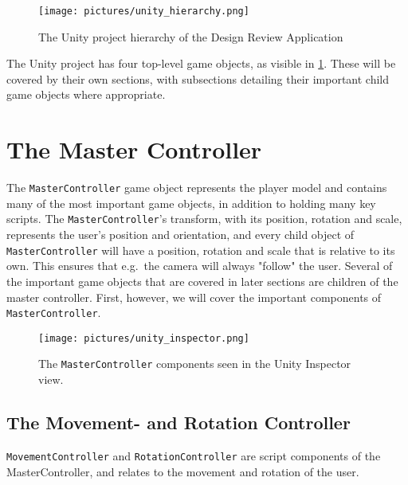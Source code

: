 \begin{figure}%
	\texttt{[image: pictures/unity\_hierarchy.png]}
	\caption[The Unity project hierarchy of the Design Review Application]{The Unity project hierarchy of the Design Review Application}
	\label{fig:unity_hierarchy}
\end{figure} 

The Unity project has four top-level game objects, as visible in \ref{fig:unity_hierarchy}. 
These will be covered by their own sections, with subsections detailing their important child game objects where appropriate.


\section{The Master Controller}
The \texttt{MasterController} game object represents the player model and contains many of the most important game objects, in addition to
holding many key scripts. The \texttt{MasterController}'s transform, with its position, rotation and scale, represents the user's position and orientation, 
and every child object of \texttt{MasterController} will have a position, rotation and scale that is relative to its own. This ensures
that e.g.~the camera will always "follow" the user. Several of the important game objects that are covered in later sections are children of 
the master controller. First, however, we will cover the important components of \texttt{MasterController}.

\begin{figure}%
	\texttt{[image: pictures/unity\_inspector.png]}
	\caption[The \texttt{MasterController} components]{The \texttt{MasterController} components seen in the Unity Inspector view.}
	\label{fig:unity_inspector}
\end{figure} 

\subsection{The Movement- and Rotation Controller}
\texttt{MovementController} and \texttt{RotationController} are script components of the MasterController, and relates to the movement and rotation of the user.


